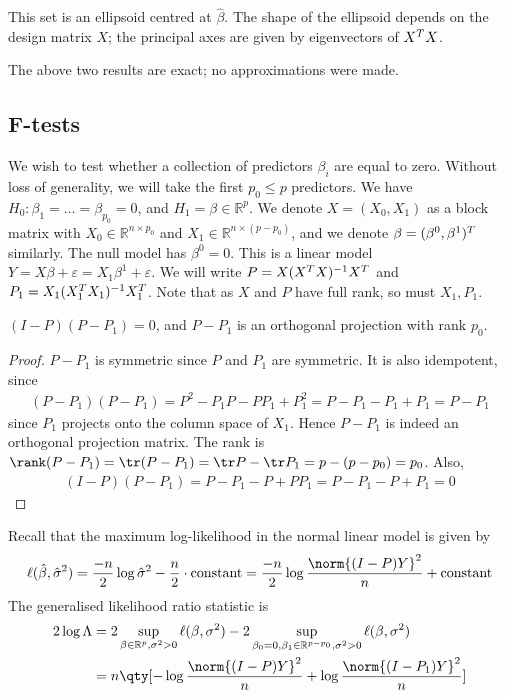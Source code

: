 \begin{example}
	This set is an ellipsoid centred at $\hat \beta$.
	The shape of the ellipsoid depends on the design matrix $X$; the principal axes are given by eigenvectors of $X^T X$.
\end{example}
The above two results are exact; no approximations were made.

\subsection{F-tests}
We wish to test whether a collection of predictors $\beta_i$ are equal to zero.
Without loss of generality, we will take the first $p_0 \leq p$ predictors.
We have $H_0 \colon \beta_1 = \dots = \beta_{p_0} = 0$, and $H_1 = \beta \in \mathbb R^p$.
We denote $X = (X_0, X_1)$ as a block matrix with $X_0 \in \mathbb R^{n \times p_0}$ and $X_1 \in \mathbb R^{n \times (p-p_0)}$, and we denote $\beta = (\beta^0, \beta^1)^T$ similarly.
The null model has $\beta^0 = 0$.
This is a linear model $Y = X\beta + \varepsilon = X_1 \beta^1 + \varepsilon$.
We will write $P = X(X^T X)^{-1} X^T$ and $P_1 = X_1 (X_1^T X_1)^{-1} X_1^T$.
Note that as $X$ and $P$ have full rank, so must $X_1, P_1$.
\begin{lemma}
	$(I-P)(P - P_1) = 0$, and $P - P_1$ is an orthogonal projection with rank $p_0$.
\end{lemma}
\begin{proof}
	$P - P_1$ is symmetric since $P$ and $P_1$ are symmetric.
	It is also idempotent, since
	\begin{align*}
		(P-P_1)(P-P_1) = P^2 - P_1 P - P P_1 + P_1^2 = P - P_1 - P_1 + P_1 = P - P_1
	\end{align*}
	since $P_1$ projects onto the column space of $X_1$.
	Hence $P - P_1$ is indeed an orthogonal projection matrix.
	The rank is $\rank(P - P_1) = \tr(P - P_1) = \tr P - \tr P_1 = p - (p - p_0) = p_0$.
	Also,
	\begin{align*}
		(I-P)(P-P_1) = P-P_1 - P + PP_1 = P-P_1 - P + P_1 = 0
	\end{align*}
\end{proof}
Recall that the maximum log-likelihood in the normal linear model is given by
\begin{align*}
	\ell(\hat \beta, \hat \sigma^2) = \frac{-n}{2} \log \hat\sigma^2 - \frac{n}{2} \cdot \text{constant} = \frac{-n}{2} \log \frac{\norm{(I-P)Y}^2}{n} + \text{constant}
\end{align*}
The generalised likelihood ratio statistic is
\begin{align*}
	2 \log \Lambda & = 2 \sup_{\beta \in \mathbb R^p,\sigma^2>0} \ell(\beta, \sigma^2) - 2 \sup_{\beta_0 = 0, \beta_1 \in \mathbb R^{p-p_0},\sigma^2>0} \ell(\beta, \sigma^2) \\
	               & = n \qty[ -\log \frac{\norm{(I-P)Y}^2}{n} + \log \frac{\norm{(I-P_1)Y}^2}{n} ]
\end{align*}
